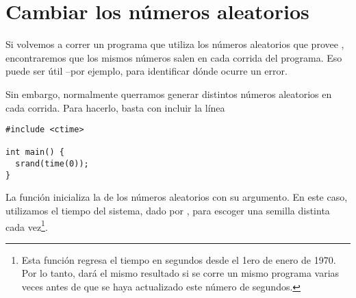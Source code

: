 \section{Cambiar los números aleatorios}

Si volvemos a correr un programa que utiliza los números aleatorios que provee
, encontraremos que los mismos números salen en cada corrida del
programa.  Eso puede ser útil --por ejemplo, para identificar dónde ocurre un
error.

Sin embargo, normalmente querramos generar distintos números aleatorios en cada
corrida. Para hacerlo, basta con incluir la línea
\begin{lstlisting}
#include <ctime>

int main() {
  srand(time(0));
}
\end{lstlisting}
La función  inicializa la  de los números aleatorios
con su argumento. En este caso, utilizamos el tiempo del sistema, dado por
, para escoger una semilla distinta cada vez\footnote{Esta
función regresa el tiempo en segundos desde el 1ero de enero de 1970. Por lo
tanto, dará el mismo resultado si se corre un mismo programa varias veces
antes de que se haya actualizado este número de segundos.}.

